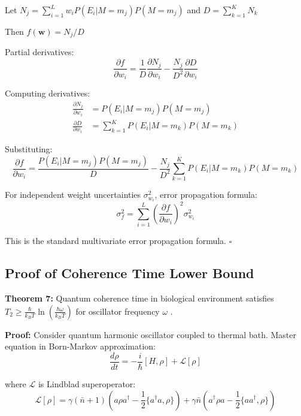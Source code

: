 Let $N_j = \sum_{i=1}^L w_i P(E_i | M = m_j) P(M = m_j)$ and $D = \sum_{k=1}^K N_k$

Then $f(\mathbf{w}) = N_j / D$

Partial derivatives:
\begin{equation}
\frac{\partial f}{\partial w_i} = \frac{1}{D} \frac{\partial N_j}{\partial w_i} - \frac{N_j}{D^2} \frac{\partial D}{\partial w_i}
\end{equation}

Computing derivatives:
\begin{align}
\frac{\partial N_j}{\partial w_i} &= P(E_i | M = m_j) P(M = m_j) \\
\frac{\partial D}{\partial w_i} &= \sum_{k=1}^K P(E_i | M = m_k) P(M = m_k)
\end{align}

Substituting:
\begin{equation}
\frac{\partial f}{\partial w_i} = \frac{P(E_i | M = m_j) P(M = m_j)}{D} - \frac{N_j}{D^2} \sum_{k=1}^K P(E_i | M = m_k) P(M = m_k)
\end{equation}

For independent weight uncertainties $\sigma_{w_i}^2$, error propagation formula:
\begin{equation}
\sigma_f^2 = \sum_{i=1}^L \left(\frac{\partial f}{\partial w_i}\right)^2 \sigma_{w_i}^2
\end{equation}

This is the standard multivariate error propagation formula. $\square$

\subsection{Proof of Coherence Time Lower Bound}

\textbf{Theorem 7:} Quantum coherence time in biological environment satisfies $T_2 \geq \frac{\hbar}{k_B T} \ln\left(\frac{\hbar \omega}{k_B T}\right)$ for oscillator frequency $\omega$ \cite{breuer2002theory}.

\textbf{Proof:}
Consider quantum harmonic oscillator coupled to thermal bath. Master equation in Born-Markov approximation:
\begin{equation}
\frac{d\rho}{dt} = -\frac{i}{\hbar}[H, \rho] + \mathcal{L}[\rho]
\end{equation}

where $\mathcal{L}$ is Lindblad superoperator:
\begin{equation}
\mathcal{L}[\rho] = \gamma(\bar{n}+1)(a\rho a^\dagger - \frac{1}{2}\{a^\dagger a, \rho\}) + \gamma \bar{n}(a^\dagger\rho a - \frac{1}{2}\{a a^\dagger, \rho\})
\end{equation}

